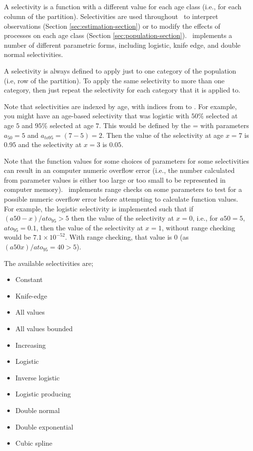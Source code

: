 \subsection{\label{sec:selectivities}}

A selectivity is a function with a different value for each age class (i.e., for each column of the partition). Selectivities are used throughout \SPM\ to interpret observations (Section \ref{sec:estimation-section}) or to modify the effects of processes on each age class (Section \ref{sec:population-section}). \SPM\ implements a number of different parametric forms, including logistic, knife edge, and double normal selectivities.

A selectivity is always defined to apply just to one category of the population (i.e, row of the partition). To apply the same selectivity to more than one category, then just repeat the selectivity for each category that it is applied to.

Note that selectivities are indexed by age, with indices from  to . For example, you might have an age-based selectivity that was logistic with $50\%$ selected at age $5$ and $95\%$ selected at age $7$. This would be defined by the = with parameters $a_{50}=5$ and $a_{to95}=(7-5)=2$. Then the value of the selectivity at age $x=7$ is $0.95$ and the selectivity at $x=3$ is $0.05$.

Note that the function values for some choices of parameters for some selectivities can result in an computer numeric overflow error (i.e., the number calculated from parameter values is either too large or too small to be represented in computer memory). \SPM\ implements range checks on some parameters to test for a possible numeric overflow error before attempting to calculate function values. For example, the logistic selectivity is implemented such that if $(a50-x)/ato_95 > 5$ then the value of the selectivity at $x=0$, i.e., for $a50=5$, $ato_95=0.1$, then the value of the selectivity at $x=1$, without range checking would be $7.1 \times 10^{-52}$. With range checking, that value is $0$ (as $(a50 x)/ato_95=40 > 5$).

The available selectivities are;

\begin{itemize}
  \item Constant
  \item Knife-edge
  \item All values
  \item All values bounded
  \item Increasing
  \item Logistic
	\item Inverse logistic
  \item Logistic producing
  \item Double normal
  \item Double exponential
	\item Cubic spline
\end{itemize}

